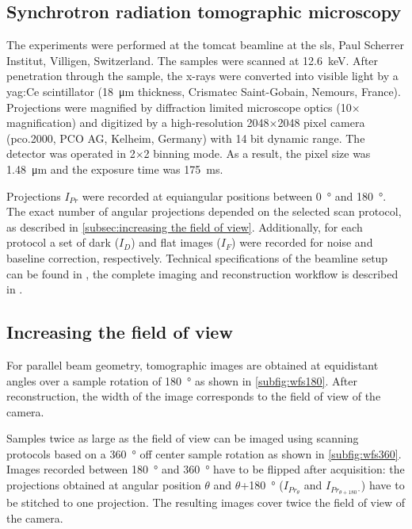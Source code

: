 \subsection{Synchrotron radiation tomographic microscopy}
The experiments were performed at the \ac{tomcat} beamline at the \acl{sls}, Paul Scherrer Institut, Villigen, Switzerland. The samples were scanned at \SI{12.6}{\kilo\electronvolt}. After penetration through the sample, the x-rays were converted into visible light by a \acs{yag}:Ce scintillator (\SI{18}{\micro\meter} thickness, Crismatec Saint-Gobain, Nemours, France). Projections were magnified by diffraction limited microscope optics (10$\times$ magnification) and digitized by a high-resolution 2048$\times$2048 pixel  camera (pco.2000, PCO AG, Kelheim, Germany) with 14 bit dynamic range. The detector was operated in 2$\times$2 binning mode. As a result, the pixel size was \SI{1.48}{\micro\meter} and the exposure time was \SI{175}{\milli\second}.

Projections $I_{Pr}$ were recorded at equiangular positions between \SI{0}{\degree} and \SI{180}{\degree}. The exact number of angular projections depended on the selected scan protocol, as described in \autoref{subsec:increasing the field of view}. Additionally, for each protocol a set of dark ($I_{D}$) and flat images ($I_{F}$) were recorded for noise and baseline correction, respectively. Technical specifications of the beamline setup can be found in \cite{Stampanoni2006a}, the complete imaging and reconstruction workflow is described in \cite{Hintermueller2010}.

\subsection{Increasing the field of view}\label{subsec:increasing the field of view}
For parallel beam geometry, tomographic images are obtained at e\-qui\-dis\-tant angles over a sample rotation of \SI{180}{\degree} as shown in \autoref{subfig:wfs180}. After reconstruction, the width of the image corresponds to the field of view of the camera.

Samples twice as large as the field of view can be imaged using scanning protocols based on a \SI{360}{\degree} off center sample rotation as shown in \autoref{subfig:wfs360}. Images recorded between \SI{180}{\degree} and \SI{360}{\degree} have to be flipped after acquisition: the projections obtained at angular position $\theta$ and $\theta$+\SI{180}{\degree} ($I_{Pr_{\theta}}$ and $I_{Pr_{\theta+\SI{180}{\degree}}}$) have to be stitched to one projection. The resulting images cover twice the field of view of the camera.

